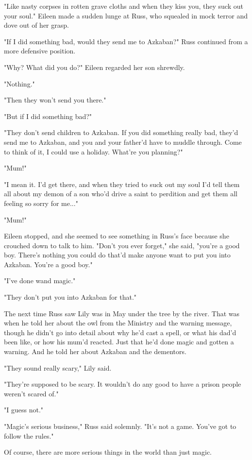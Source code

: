 \documentclass[a4paper,11pt]{article}
\begin{document}
"Like nasty corpses in rotten grave cloths and when they kiss you, they suck out your soul." Eileen made a sudden lunge at Russ, who squealed in mock terror and dove out of her grasp.

"If I did something bad, would they send me to Azkaban?" Russ continued from a more defensive position.

"Why? What did you do?" Eileen regarded her son shrewdly.

"Nothing."

"Then they won't send you there."

"But if I did something bad?"

"They don't send children to Azkaban. If you did something really bad, they'd send me to Azkaban, and you and your father'd have to muddle through. Come to think of it, I could use a holiday. What're you planning?"

"Mum!"

"I mean it. I'd get there, and when they tried to suck out my soul I'd tell them all about my demon of a son who'd drive a saint to perdition and get them all feeling so sorry for me..."

"Mum!"

Eileen stopped, and she seemed to see something in Russ's face because she crouched down to talk to him. "Don't you ever forget," she said, "you're a good boy. There's nothing you could do that'd make anyone want to put you into Azkaban. You're a good boy."

"I've done wand magic."

"They don't put you into Azkaban for that."

The next time Russ saw Lily was in May under the tree by the river. That was when he told her about the owl from the Ministry and the warning message, though he didn't go into detail about why he'd cast a spell, or what his dad'd been like, or how his mum'd reacted. Just that he'd done magic and gotten a warning. And he told her about Azkaban and the dementors.

"They sound really scary," Lily said.

"They're supposed to be scary. It wouldn't do any good to have a prison people weren't scared of."

"I guess not."

"Magic's serious business," Russ said solemnly. "It's not a game. You've got to follow the rules."

Of course, there are more serious things in the world than just magic.
\end{document}
